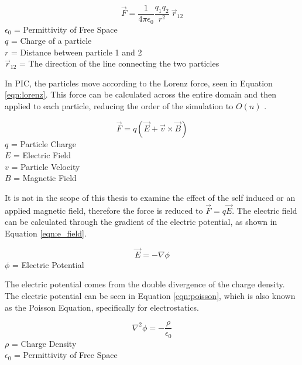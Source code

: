 \begin{equation}
    \label{eqn:coulmb}
    \vec{F} = \frac{1}{4 \pi \epsilon_0} \frac{q_1 q_2}{r^2}  \: \vec{r}_{12}
\end{equation}
\(\epsilon_0\) = Permittivity of Free Space \\
\(q\) = Charge of a particle \\
\(r\) = Distance between particle 1 and 2 \\
\(\vec{r}_{12}\) = The direction of the line connecting the two particles \par

\indent In PIC, the particles move according to the Lorenz force, seen in Equation \ref{eqn:lorenz}. This force can be calculated across the entire domain and then applied to each particle, reducing the order of the simulation to \(O(n)\) \cite{es-pic}. \par

\begin{equation}
    \label{eqn:lorenz}
    \vec{F} = q (\vec{E} + \vec{v}  \times \vec{B})
\end{equation}
\(q\) = Particle Charge \\
\(E\) = Electric Field \\
\(v\) = Particle Velocity \\
\(B\) = Magnetic Field \par

\indent It is not in the scope of this thesis to examine the effect of the self induced or an applied magnetic field, therefore the force is reduced to \(\vec{F} = q \vec{E}\). The electric field can be calculated through the gradient of the electric potential, as shown in Equation \ref{eqn:e_field}. \par


\begin{equation}
    \label{eqn:e_field}
    \vec{E} = - \nabla \phi
\end{equation}
\(\phi\) = Electric Potential \par

\indent The electric potential comes from the double divergence of the charge density. The electric potential can be seen in Equation \ref{eqn:poisson}, which is also known as the Poisson Equation, specifically for electrostatics. \par

\begin{equation}
    \label{eqn:poisson}
    \nabla^2 \phi = - \frac{\rho}{\epsilon_0}
\end{equation}
\(\rho\) = Charge Density \\
\(\epsilon_0\) = Permittivity of Free Space \par

